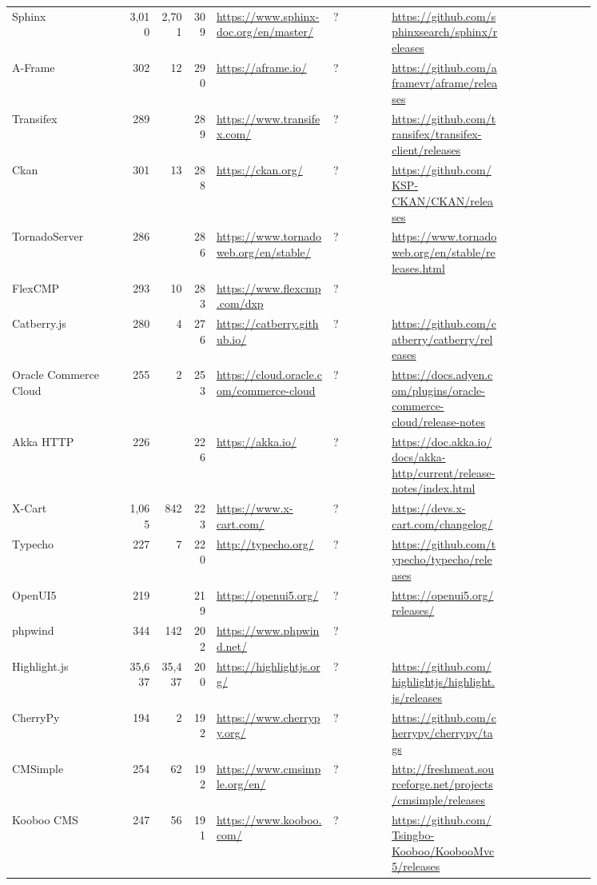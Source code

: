 \begin{longtable}{|p{0.2\linewidth}|r|r|r|p{0.2\linewidth}|p{0.1\linewidth}|p{0.2\linewidth}|p{0.15\linewidth}|}
	Sphinx &3,010 &2,701 &309 &\url{https://www.sphinx-doc.org/en/master/} &? &\url{https://github.com/sphinxsearch/sphinx/releases} \\
	A-Frame &302 &12 &290 &\url{https://aframe.io/} &? &\url{https://github.com/aframevr/aframe/releases} \\
	Transifex &289 & &289 &\url{https://www.transifex.com/} &? &\url{https://github.com/transifex/transifex-client/releases} \\
	Ckan &301 &13 &288 &\url{https://ckan.org/} &? &\url{https://github.com/KSP-CKAN/CKAN/releases} \\
	TornadoServer &286 & &286 &\url{https://www.tornadoweb.org/en/stable/} &? &\url{https://www.tornadoweb.org/en/stable/releases.html} \\
	FlexCMP &293 &10 &283 &\url{https://www.flexcmp.com/dxp} &? & \\
	Catberry.js &280 &4 &276 &\url{https://catberry.github.io/} &? &\url{https://github.com/catberry/catberry/releases} \\
	Oracle Commerce Cloud &255 &2 &253 &\url{https://cloud.oracle.com/commerce-cloud} &? &\url{https://docs.adyen.com/plugins/oracle-commerce-cloud/release-notes} \\
	Akka HTTP &226 & &226 &\url{https://akka.io/} &? &\url{https://doc.akka.io/docs/akka-http/current/release-notes/index.html} \\
	X-Cart &1,065 &842 &223 &\url{https://www.x-cart.com/} &? &\url{https://devs.x-cart.com/changelog/} \\
	Typecho &227 &7 &220 &\url{http://typecho.org/} &? &\url{https://github.com/typecho/typecho/releases} \\
	OpenUI5 &219 & &219 &\url{https://openui5.org/} &? &\url{https://openui5.org/releases/} \\
	phpwind &344 &142 &202 &\url{https://www.phpwind.net/} &? & \\
	Highlight.js &35,637 &35,437 &200 &\url{https://highlightjs.org/} &? &\url{https://github.com/highlightjs/highlight.js/releases} \\
	CherryPy &194 &2 &192 &\url{https://www.cherrypy.org/} &? &\url{https://github.com/cherrypy/cherrypy/tags} \\
	CMSimple &254 &62 &192 &\url{https://www.cmsimple.org/en/} &? &\url{http://freshmeat.sourceforge.net/projects/cmsimple/releases} \\
	Kooboo CMS &247 &56 &191 &\url{https://www.kooboo.com/} &? &\url{https://github.com/Tsingbo-Kooboo/KoobooMvc5/releases} \\

\end{longtable}
